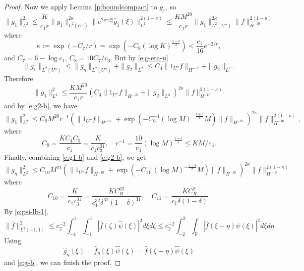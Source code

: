 \documentclass[reqno,12pt,letterpaper]{amsart}
\numberwithin{equation}{section}
\numberwithin{prop}{section}
\begin{document}
\begin{proof}
Now we apply Lemma \ref{p:boundcompact} to $g_1$, so
\begin{equation*}
\|g_1\|_{L^2}^2\leq\frac{K}{c_1r}\|g_1\|_{L^2(U'')}^{2\kappa}\|e^{2\pi r|\xi|}\widehat{g}_1(\xi)\|_{L^2}^{2(1-\kappa)}
\leq \frac{KM^{20}}{c_1r}\|g_1\|_{L^2(U'')}^{2\kappa}\|f\|_{H^{-10}}^{2(1-\kappa)}
\end{equation*}
where
\begin{equation*}
\kappa:=\exp(-C_7/r)=\exp(-C_8(\log K)^{\frac{1+\delta}{2}})<\frac{c_1}{16}e^{-2/r},
\end{equation*}
and $C_7=6-\log c_1$, $C_8=10C_7/c_3$. But by \eqref{e:g-eta-u}
\begin{equation*}
\|g_1\|_{L^2(U'')}\leq\|g_\eta\|_{L^2(U'')}+\|g_2\|_{L^2}
\leq C_4\|1_{U''}f\|_{H^{-10}}+\|g_2\|_{L^2}.
\end{equation*}
Therefore
\begin{equation*}
\|g_1\|_{L^2}^2
\leq \frac{KM^{20}}{c_1r} (C_4\|1_{U''}f\|_{H^{-10}}+\|g_2\|_{L^2})^{2\kappa}
\|f\|_{H^{-10}}^{2(1-\kappa)}
\end{equation*}
and by \eqref{e:g2-b}, we have
\begin{equation}
\label{e:g1-b}
\|g_1\|_{L^2}^2
\leq C_9M^{20}r^{-1}(\|1_{U''}f\|_{H^{-10}}+\exp(-C_6^{-1}(\log M)^{-\frac{1+\delta}{2}}M)\|f\|_{H^{-10}})^{2\kappa}\|f\|_{H^{-10}}^{2(1-\kappa)},
\end{equation}
where
\begin{equation*}
C_9=\frac{KC_4C_5}{c_1}=\frac{K}{c_1c_3^{31}},
\quad r^{-1}=\frac{10}{c_3}(\log M)^{\frac{1+\delta}{2}}\leq KM/c_3.
\end{equation*}
Finally, combining \eqref{e:g1-b} and \eqref{e:g2-b}, we get
\begin{equation}
\label{e:g-b}
\|g_\eta\|_{L^2}^2
\leq C_{10}M^{21}(\|1_{U''}f\|_{H^{-10}}+\exp(-C_{11}^{-1}(\log M)^{-\frac{1+\delta}{2}}M)\|f\|_{H^{-10}})^{2\kappa}\|f\|_{H^{-10}}^{2(1-\kappa)}
\end{equation}
where
\begin{equation*}
C_{10}=\frac{K}{c_1c_3^{31}}=\frac{KC_R^{62}}{c_1^{32}\delta^{31}(1-\delta)^{31}},
\quad C_{11}=\frac{KC_R^2}{c_1\delta(1-\delta)}.
\end{equation*}
By \eqref{e:psi-lb-1},
\begin{equation*}
\|\widehat{f}\|_{L^2(-1,1)}^2
\leq c_2^{-2}\int_{-1}^1\int_{-1}^1|\widehat{f}(\zeta)\widehat{\psi}(\xi)|^2d\xi d\zeta
\leq c_2^{-2}\int_{-2}^2\int_{\mathbb{R}}|\widehat{f}(\xi-\eta)\widehat{\psi}(\xi)|^2d\xi d\eta
\end{equation*}
Using 
\begin{equation*}
\widehat{g}_\eta(\xi)=\widehat{f}_\eta(\xi)\widehat{\psi}(\xi)=\widehat{f}(\xi-\eta)\widehat{\psi}(\xi)
\end{equation*}
and \eqref{e:g-b}, we can finish the proof.
\end{proof}
\end{document}
